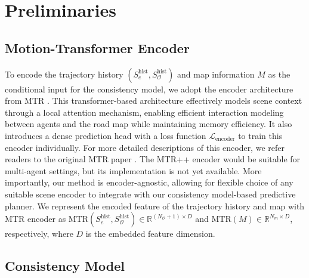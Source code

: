 \section{Preliminaries}

\subsection{Motion-Transformer Encoder} \label{sec: mtr encoder}

To encode the trajectory history $(S_e^{\text{hist}}, S_\mathcal{O}^{\text{hist}})$ and map information $M$ as the conditional input for the consistency model, we adopt the encoder architecture from MTR \citep{shi2022motion,shi2024mtr++}.
This transformer-based architecture effectively models scene context through a local attention mechanism, enabling efficient interaction modeling between agents and the road map while maintaining memory efficiency.
It also introduces a dense prediction head with a loss function $\mathcal{L}_{\text{encoder}}$ to train this encoder individually.
For more detailed descriptions of this encoder, we refer readers to the original MTR paper \citep{shi2022motion}.
The MTR++ encoder \cite{shi2024mtr++} would be suitable for multi-agent settings, but its implementation is not yet available.
More importantly, our method is encoder-agnostic, allowing for flexible choice of any suitable scene encoder to integrate with our consistency model-based predictive planner.
We represent the encoded feature of the trajectory history and map with MTR encoder as $\text{MTR}(S_e^{\text{hist}}, S_\mathcal{O}^{\text{hist}}) \in \mathbb{R}^{(N_{\mathcal{O}} + 1) \times D}$ and $\text{MTR}(M) \in \mathbb{R}^{N_m \times D}$, respectively, where $D$ is the embedded feature dimension.

\subsection{Consistency Model}\label{sec: consistency model intro}

